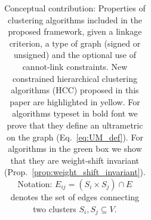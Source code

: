 \begin{table}[t]
\begin{subtable}[t!]{\textwidth}
\begin{tabular}{l |c  c  c  c  c}
            
             


             





        \end{tabular}
    \end{subtable} 
    \caption{Conceptual contribution: Properties of clustering algorithms included in the proposed \algname{} framework, given a linkage criterion, a type of graph (signed or unsigned) and the optional use of cannot-link constraints. New constrained hierarchical clustering algorithms (HCC) proposed in this paper are highlighted in yellow. For algorithms typeset in bold font we prove that they define an ultrametric on the graph (Eq.~\ref{eq:UM_def}). For algorithms in the green box we show that they are weight-shift invariant (Prop.~\ref{prop:weight_shift_invariant}). 
    Notation: 
    $E_{ij}=(S_i \times S_{j}) \cap E$ denotes the set of edges connecting two clusters $S_i, S_j \subseteq V$. } 
    \label{tab:linkage-criteria}
\end{table}



